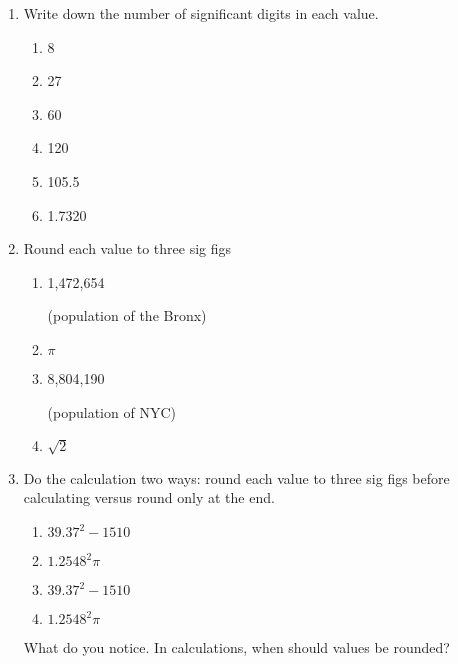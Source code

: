 \begin{enumerate}
  \item Write down the number of significant digits in each value.
  \begin{multicols}{3}
    \begin{enumerate}[itemsep=1cm]
      \item 8
      \item 27
      \item 60
      \item 120
      \item 105.5
      \item 1.7320
    \end{enumerate}
  \end{multicols} \vspace{1cm}

\item Round each value to three sig figs
  \begin{multicols}{2}
    \begin{enumerate}[itemsep=0.5cm]
      \item 1,472,654 \par (population of the Bronx)
      \item $\pi$
      \item 8,804,190 \par (population of NYC)
      \item $\sqrt{2}$
    \end{enumerate}
  \end{multicols} \vspace{1cm}

\item Do the calculation two ways: round each value to three sig figs before calculating versus round only at the end.
  \begin{multicols}{2}
    \begin{enumerate}[itemsep=3cm]
      \item $39.37^2-1510$
      \item $1.2548^2 \pi$
      \item $39.37^2-1510$
      \item $1.2548^2 \pi$
    \end{enumerate}
  \end{multicols} \vspace{1cm}
  What do you notice. In calculations, when should values be rounded?


\end{enumerate}
